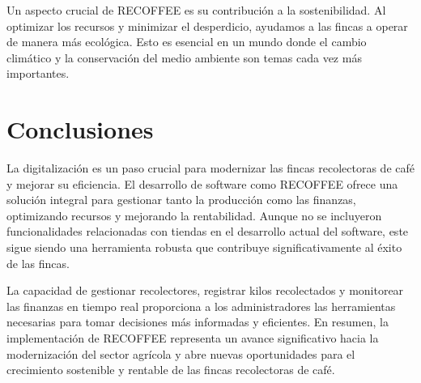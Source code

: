 \documentclass[12pt]{article}
\begin{document}
Un aspecto crucial de RECOFFEE es su contribución a la sostenibilidad. Al optimizar los recursos y minimizar el desperdicio, ayudamos a las fincas a operar de manera más ecológica. Esto es esencial en un mundo donde el cambio climático y la conservación del medio ambiente son temas cada vez más importantes.

\section{Conclusiones}

La digitalización es un paso crucial para modernizar las fincas recolectoras de café y mejorar su eficiencia. El desarrollo de software como RECOFFEE ofrece una solución integral para gestionar tanto la producción como las finanzas, optimizando recursos y mejorando la rentabilidad. Aunque no se incluyeron funcionalidades relacionadas con tiendas en el desarrollo actual del software, este sigue siendo una herramienta robusta que contribuye significativamente al éxito de las fincas.

La capacidad de gestionar recolectores, registrar kilos recolectados y monitorear las finanzas en tiempo real proporciona a los administradores las herramientas necesarias para tomar decisiones más informadas y eficientes. En resumen, la implementación de RECOFFEE representa un avance significativo hacia la modernización del sector agrícola y abre nuevas oportunidades para el crecimiento sostenible y rentable de las fincas recolectoras de café.
\end{document}
